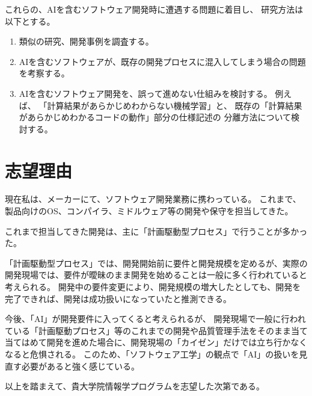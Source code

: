 \documentclass[12pt]{jsarticle}
\begin{document}
これらの、AIを含むソフトウェア開発時に遭遇する問題に着目し、
研究方法は以下とする。

\begin{enumerate}
\item 類似の研究、開発事例を調査する。
\item AIを含むソフトウェアが、既存の開発プロセスに混入してしまう場合の問題を考察する。
\item AIを含むソフトウェア開発を、誤って進めない仕組みを検討する。
例えば、
「計算結果があらかじめわからない機械学習」と、
既存の「計算結果があらかじめわかるコードの動作」部分の仕様記述の
分離方法について検討する。
\end{enumerate}

\section{志望理由}
現在私は、メーカーにて、ソフトウェア開発業務に携わっている。
これまで、製品向けのOS、コンパイラ、ミドルウェア等の開発や保守を担当してきた。

これまで担当してきた開発は、主に「計画駆動型プロセス」で行うことが多かった。

「計画駆動型プロセス」では、開発開始前に要件と開発規模を定めるが、実際の開発現場では、要件が曖昧のまま開発を始めることは一般に多く行われていると考えられる。
開発中の要件変更により、開発規模の増大したとしても、開発を完了できれば、開発は成功扱いになっていたと推測できる。

今後、「AI」が開発要件に入ってくると考えられるが、
開発現場で一般に行われている「計画駆動プロセス」等のこれまでの開発や品質管理手法をそのまま当て当てはめて開発を進めた場合に、開発現場の「カイゼン」だけでは立ち行かなくなると危惧される。
このため、「ソフトウェア工学」の観点で「AI」の扱いを見直す必要があると強く感じている。

以上を踏まえて、貴大学院情報学プログラムを志望した次第である。
\end{document}
